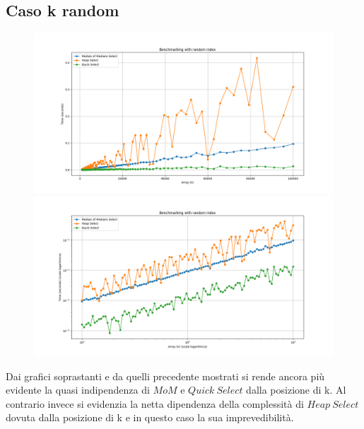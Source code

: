 \documentclass[a4paper]{article}
\begin{document}
\subsection{Caso k random}
\begin{figure}[h]
            \centering
            \includegraphics[width=.83\textwidth]{graphs/k_random_n.png}
            \includegraphics[width=.83\textwidth]{graphs/k_random_2xlog.png}
\end{figure}
Dai grafici soprastanti e da quelli precedente mostrati si rende ancora più evidente la quasi indipendenza di $MoM$ e $Quick\ Select$ dalla posizione di k. Al contrario invece si evidenzia la netta dipendenza della complessità di $Heap\ Select$ dovuta dalla posizione di k e in questo caso la sua imprevedibilità.\\
\newpage
\end{document}
